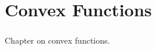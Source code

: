 \chapter{Convex Functions}
\label{chap:02}

\paragraph{}Chapter on convex functions.




\newpage

\newpage

